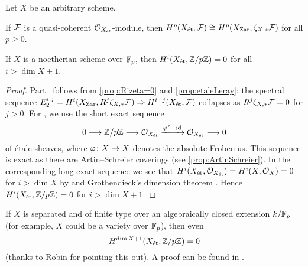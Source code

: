 \begin{cor}\label{cor:etaleCoho=ZariskiCoho}
	Let $X$ be an arbitrary scheme.
	\begin{alphanumerate}
		\item If $\mathcal{F}$ is a quasi-coherent $\mathcal{O}_{X_{\mathrm{\acute{e}t}}}$-module, then $H^p(X_{\mathrm{\acute{e}t}},\mathcal{F})\cong H^p(X_{\mathrm{Zar}},\zeta_{X,*}\mathcal{F})$ for all $p\geq 0$.
		\item If $X$ is a noetherian scheme over $\mathbb{F}_p$, then $H^i(X_{\mathrm{\acute{e}t}},\mathbb{Z}/p\mathbb{Z})=0$ for all $i>\dim X+1$.
	\end{alphanumerate}
\end{cor}
\begin{proof}
	Part~ follows from \cref{prop:Rizeta=0} and \cref{prop:etaleLeray}: the spectral sequence $E_2^{i,j}=H^i(X_\Zar,R^j\zeta_{X,*}\Ff)\converge H^{i+j}(X_\et,\Ff)$ collapses as $R^j\zeta_{X,*}\mathcal{F}=0$ for $j>0$. For , we use the short exact sequence
	\begin{equation*}
	0\morphism \IZ/p\IZ\morphism \Oo_{X_\et}\xrightarrow{\phi^*-\id}\Oo_{X_\et}\morphism 0
	\end{equation*}
	of étale sheaves, where $\phi\colon X\morphism X$ denotes the absolute Frobenius. This sequence is exact as there are Artin--Schreier coverings (see \cref{prop:ArtinSchreier}). In the corresponding long exact sequence we see that $H^i(X_{\mathrm{\acute{e}t}},\mathcal{O}_{X_{\mathrm{\acute{e}t}}})=H^i(X,\mathcal{O}_X)=0$ for $i>\dim X$ by  and Grothendieck's dimension theorem \cite[Théorème~3.6.5]{tohoku}. Hence $H^i(X_{\mathrm{\acute{e}t}},\mathbb{Z}/p\mathbb{Z})=0$ for $i>\dim X+1$.
\end{proof}
\begin{rem*}
	If $X$ is separated and of finite type over an algebraically closed extension $k/\mathbb{F}_p$ (for example, $X$ could be a variety over $\ov{\IF}_p$), then even
	\begin{equation*}
	H^{\dim X+1}(X_{\mathrm{\acute{e}t}},\mathbb{Z}/p\mathbb{Z})=0
	\end{equation*}
	(thanks to Robin for pointing this out). A proof can be found in \cite[]{stacks-project}.
\end{rem*}
